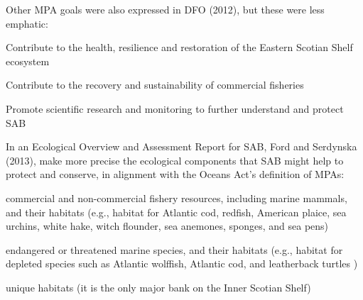 \documentclass[letterpaper,portrait,12pt]{scrartcl}
\numberwithin{equation}{section}		%
\numberwithin{figure}{section}			%
\numberwithin{table}{section}				%
\begin{document}
Other MPA goals were also expressed in DFO (2012), but these were less emphatic:

\begin{flushleft}

	Contribute to the health, resilience and restoration of the Eastern Scotian Shelf ecosystem

\end{flushleft}


\begin{flushleft}

	Contribute to the recovery and sustainability of commercial fisheries 

\end{flushleft}


\begin{flushleft}

	Promote scientific research and monitoring to further understand and protect SAB

\end{flushleft}


In an Ecological Overview and Assessment Report for SAB, Ford and Serdynska (2013), make more precise the ecological components that SAB might help to protect and conserve, in alignment with the Oceans Act's definition of MPAs:








\begin{flushleft}

	commercial and non-commercial fishery resources, including marine mammals, and their habitats (e.g., habitat for Atlantic cod, redfish, American plaice, sea urchins, white hake, witch flounder, sea anemones, sponges, and sea pens)

\end{flushleft}


\begin{flushleft}

	endangered or threatened marine species, and their habitats (e.g., habitat for depleted species such as Atlantic wolffish, Atlantic cod, and leatherback turtles )

\end{flushleft}


\begin{flushleft}

	unique habitats (it is the only major bank on the Inner Scotian Shelf)

\end{flushleft}
\end{document}
